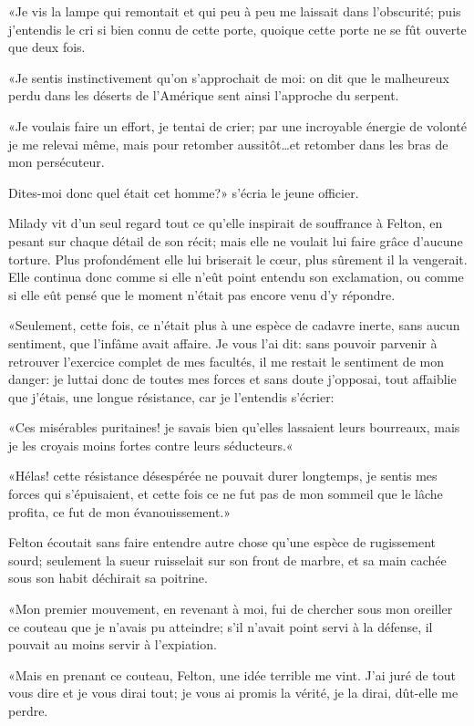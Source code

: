 «Je vis la lampe qui remontait et qui peu à peu me laissait dans l'obscurité; puis j'entendis le cri si bien connu de cette porte, quoique cette porte ne se fût ouverte que deux fois. 

«Je sentis instinctivement qu'on s'approchait de moi: on dit que le malheureux perdu dans les déserts de l'Amérique sent ainsi l'approche du serpent. 

«Je voulais faire un effort, je tentai de crier; par une incroyable énergie de volonté je me relevai même, mais pour retomber aussitôt\dots et retomber dans les bras de mon persécuteur. 

\speak  Dites-moi donc quel était cet homme?» s'écria le jeune officier. 

Milady vit d'un seul regard tout ce qu'elle inspirait de souffrance à Felton, en pesant sur chaque détail de son récit; mais elle ne voulait lui faire grâce d'aucune torture. Plus profondément elle lui briserait le cœur, plus sûrement il la vengerait. Elle continua donc comme si elle n'eût point entendu son exclamation, ou comme si elle eût pensé que le moment n'était pas encore venu d'y répondre. 

«Seulement, cette fois, ce n'était plus à une espèce de cadavre inerte, sans aucun sentiment, que l'infâme avait affaire. Je vous l'ai dit: sans pouvoir parvenir à retrouver l'exercice complet de mes facultés, il me restait le sentiment de mon danger: je luttai donc de toutes mes forces et sans doute j'opposai, tout affaiblie que j'étais, une longue résistance, car je l'entendis s'écrier: 

«Ces misérables puritaines! je savais bien qu'elles lassaient leurs bourreaux, mais je les croyais moins fortes contre leurs séducteurs.« 

«Hélas! cette résistance désespérée ne pouvait durer longtemps, je sentis mes forces qui s'épuisaient, et cette fois ce ne fut pas de mon sommeil que le lâche profita, ce fut de mon évanouissement.» 

Felton écoutait sans faire entendre autre chose qu'une espèce de rugissement sourd; seulement la sueur ruisselait sur son front de marbre, et sa main cachée sous son habit déchirait sa poitrine. 

«Mon premier mouvement, en revenant à moi, fui de chercher sous mon oreiller ce couteau que je n'avais pu atteindre; s'il n'avait point servi à la défense, il pouvait au moins servir à l'expiation. 

«Mais en prenant ce couteau, Felton, une idée terrible me vint. J'ai juré de tout vous dire et je vous dirai tout; je vous ai promis la vérité, je la dirai, dût-elle me perdre. 

